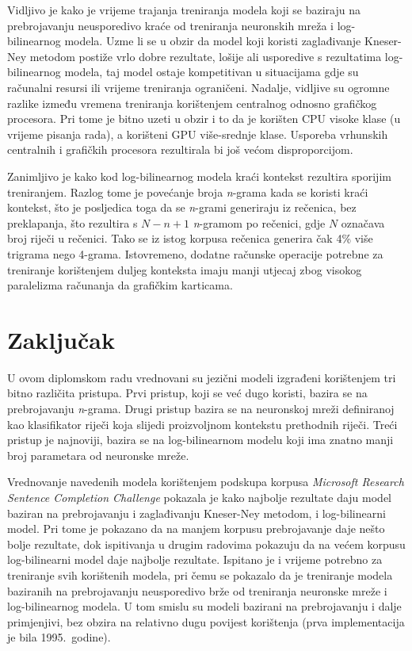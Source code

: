 \documentclass[times, utf8, diplomski, numeric]{fer}
\begin{document}
Vidljivo je kako je vrijeme trajanja treniranja modela koji se baziraju na prebrojavanju neusporedivo kraće od treniranja neuronskih mreža i log-bilinearnog modela. Uzme li se u obzir da model koji koristi zaglađivanje Kneser-Ney metodom postiže vrlo dobre rezultate, lošije ali usporedive s rezultatima log-bilinearnog modela, taj model ostaje kompetitivan u situacijama gdje su računalni resursi ili vrijeme treniranja ograničeni. Nadalje, vidljive su ogromne razlike između vremena treniranja korištenjem centralnog odnosno grafičkog procesora. Pri tome je bitno uzeti u obzir i to da je korišten CPU visoke klase (u vrijeme pisanja rada), a korišteni GPU više-srednje klase. Usporeba vrhunskih centralnih i grafičkih procesora rezultirala bi još većom disproporcijom.

Zanimljivo je kako kod log-bilinearnog modela kraći kontekst rezultira sporijim treniranjem. Razlog tome je povećanje broja \textit{n}-grama kada se koristi kraći kontekst, što je posljedica toga da se \textit{n}-grami generiraju iz rečenica, bez preklapanja, što rezultira s $N - n + 1$ \textit{n}-gramom po rečenici, gdje $N$ označava broj riječi u rečenici. Tako se iz istog korpusa rečenica generira čak 4\% više trigrama nego 4-grama. Istovremeno, dodatne računske operacije potrebne za treniranje korištenjem duljeg konteksta imaju manji utjecaj zbog visokog paralelizma računanja da grafičkim karticama.

\chapter{Zaključak}

U ovom diplomskom radu vrednovani su jezični modeli izgrađeni korištenjem tri bitno različita pristupa. Prvi pristup, koji se već dugo koristi, bazira se na prebrojavanju \textit{n}-grama. Drugi pristup bazira se na neuronskoj mreži definiranoj kao klasifikator riječi koja slijedi proizvoljnom kontekstu prethodnih riječi. Treći pristup je najnoviji, bazira se na log-bilinearnom modelu koji ima znatno manji broj parametara od neuronske mreže.

Vrednovanje navedenih modela korištenjem podskupa korpusa \textit{Microsoft Research Sentence Completion Challenge} pokazala je kako najbolje rezultate daju model baziran na prebrojavanju i zaglađivanju Kneser-Ney metodom, i log-bilinearni model. Pri tome je pokazano da na manjem korpusu prebrojavanje daje nešto bolje rezultate, dok ispitivanja u drugim radovima pokazuju da na većem korpusu log-bilinearni model daje najbolje rezultate. Ispitano je i vrijeme potrebno za treniranje svih korištenih modela, pri čemu se pokazalo da je treniranje modela baziranih na prebrojavanju neusporedivo brže od treniranja neuronske mreže i log-bilinearnog modela. U tom smislu su modeli bazirani na prebrojavanju i dalje primjenjivi, bez obzira na relativno dugu povijest korištenja (prva implementacija je bila 1995.\ godine).
\end{document}
